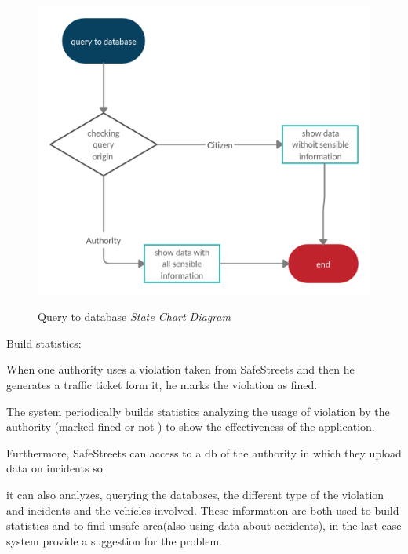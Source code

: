 \documentclass[../RASD.tex]{subfiles}
\begin{document}
    \begin{figure}[H]
        \centering
        \includegraphics[scale = 0.3]{assets/queryDbV1.png}\\[1.6 cm]
        \caption[ Query to database \textit{State Chart Diagram}]{ Query to database \textit{State Chart Diagram}}
    \end{figure}


    Build statistics:

    When one authority uses a violation taken from SafeStreets and then he generates a traffic ticket form it, he marks the violation as fined.

    The system periodically builds statistics analyzing the usage of violation by the authority (marked fined or not ) to show the effectiveness of the application.

    Furthermore, SafeStreets can access to a db of the authority in which they upload data on incidents so

    it can also analyzes, querying the databases, the different type of the violation and incidents and the vehicles involved. These information are both used to build statistics and to find unsafe area(also using data about accidents), in the last case system provide a suggestion for the problem.
\end{document}
